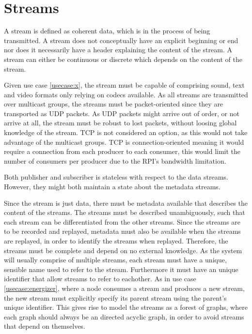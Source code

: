 \section{Streams}
A stream is defined as coherent data, which is in the process of being transmitted. A stream does not conceptually have an explicit beginning or end nor does it necessarily have a header explaining the content of the stream. A stream can either be continuous or discrete which depends on the content of the stream. 


Given use case \ref{usecase:x}, the stream must be capable of comprising sound, text and video formats only relying on codecs available. As all streams are transmitted over multicast groups, the streams must be packet-oriented since they are transported as UDP packets.
As UDP packets might arrive out of order, or not arrive at all, the stream must be robust to lost packets, without loosing global knowledge of the stream.
TCP is not considered an option, as this would not take advantage of the multicast groups. TCP is connection-oriented meaning it would require a connection from each producer to each consumer, this would limit the number of consumers per producer due to the RPI's bandwidth limitation.

Both publisher and subscriber is stateless with respect to the data streams. However, they might both maintain a state about the metadata streams.

Since the stream is just data, there must be metadata available that describes the content of the streams. The streams must be described unambiguously, such that each stream can be differentiated from the other streams. Since the streams are to be recorded and replayed, metadata must also be available when the streams are replayed, in order to identify the streams when replayed. Therefore, the streams must be complete and depend on no external knowledge.
As the system will usually comprise of multiple streams, each stream must have a unique, sensible name used to refer to the stream. Furthermore it must have an unique identifier that allow streams to refer to eachother.
As in use case \ref{usecase:energizer}, where a node consumes a stream and produces a new stream, the new stream must explicitly specify its parent stream using the parent's unique identifier. This gives rise to model the streams as a forest of graphs, where each graph should always be an directed acyclic graph, in order to avoid streams that depend on themselves.

